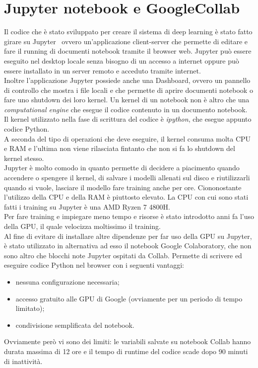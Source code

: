 \section{Jupyter notebook e GoogleCollab}
Il codice che è stato sviluppato per creare il sistema di deep learning è stato fatto girare su Jupyter~\cite{jn} 
ovvero un'applicazione client-server che permette di editare e fare il running di documenti notebook tramite 
il browser web. Jupyter può essere eseguito nel desktop locale senza bisogno di un accesso a internet oppure
può essere installato in un server remoto e acceduto tramite internet. \\
Inoltre l'applicazione Jupyter possiede anche una Dashboard, ovvero un pannello di controllo che mostra i file 
locali e che permette di aprire documenti notebook o fare uno shutdown dei loro kernel. Un kernel di un 
notebook non è altro che una \emph{computational engine} che esegue il codice contenuto in un documento notebook.
Il kernel utilizzato nella fase di scrittura del codice è \emph{ipython}, che esegue appunto codice Python.\\
A seconda del tipo di operazioni che deve eseguire, il kernel consuma molta CPU e RAM e l'ultima non viene 
rilasciata fintanto che non si fa lo shutdown del kernel stesso. \\
Jupyter è molto comodo in quanto permette di decidere a piacimento quando accendere o spengere il kernel, di salvare 
i modelli allenati sul disco e riutilizzarli quando si vuole, lasciare il modello fare training anche per ore. Ciononostante
l'utilizzo della CPU e della RAM è piuttosto elevato. La CPU con cui sono stati fatti i training su Jupyter è una AMD Ryzen 7 4800H.\\
Per fare training e impiegare meno tempo e risorse è stato introdotto anni fa l'uso della GPU, il quale
velocizza moltissimo il training. \\
Al fine di evitare di installare altre dipendenze per far uso della GPU su Jupyter, è stato utilizzato
in alternativa ad esso il notebook Google Colaboratory, che non sono altro che blocchi note Jupyter ospitati da Collab.
  Permette di scrivere ed eseguire codice Python
 nel browser con i seguenti vantaggi:
 \begin{itemize}
     \item nessuna configurazione necessaria;
    \item  accesso gratuito alle GPU di Google (ovviamente per un periodo di tempo limitato);
    \item condivisione semplificata del notebook.
 \end{itemize}
 Ovviamente però vi sono dei limiti: le variabili salvate su notebook Collab hanno durata massima di 12 ore e 
 il tempo di runtime del codice scade dopo 90 minuti di inattività. \\

 
